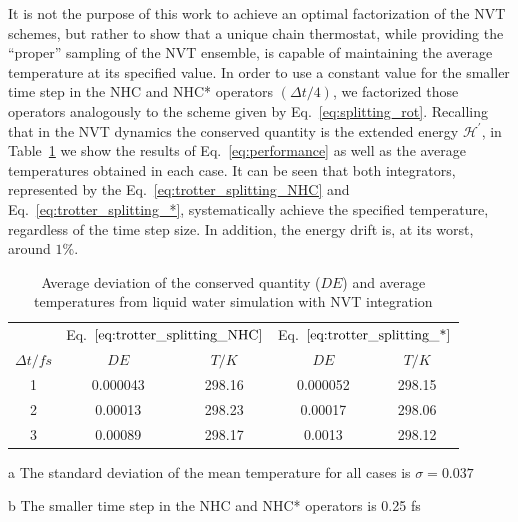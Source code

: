 \documentclass[aip,jcp,reprint,amsmath,amssymb]{revtex4-1}
\begin{document}
It is not the purpose of this work to achieve an optimal factorization of the NVT schemes, but rather to show that a unique chain thermostat, while providing the ``proper'' sampling of the NVT ensemble, is capable of maintaining the average temperature at its specified value. In order to use a constant value for the smaller time step in the NHC and NHC* operators $(\Delta t/4)$, we factorized those operators analogously to the scheme given by Eq.~\ref{eq:splitting_rot}. Recalling that in the NVT dynamics the conserved quantity is the extended energy $\mathcal{H}^\prime$, in Table~\ref{table:denvt} we show the results of Eq.~\ref{eq:performance} as well as the average temperatures obtained in each case. It can be seen that both integrators, represented by the Eq.~\ref{eq:trotter_splitting_NHC} and Eq.~\ref{eq:trotter_splitting_*}, systematically achieve the specified temperature, regardless of the time step size. In addition, the energy drift is, at its worst, around $1 \%$.


\begin{table}[h]
\setlength{\tabcolsep}{7pt}
\begin{threeparttable}
\caption{Average deviation of the conserved quantity ($DE$) and average temperatures from liquid water simulation with NVT integration } 
\label{table:denvt}

\centering %
\begin{tabular}{|c c c c c |}  
\hline
& \multicolumn{2}{c}{Eq.~$\ref{eq:trotter_splitting_NHC}$} &\multicolumn{2}{c|}{Eq.~$\ref{eq:trotter_splitting_*}$} \\
\cline{2-5}
$\Delta t/fs$ &$D E$ &$T/K$ &$D E$ &$T/K$\\
\hline %
 1  & 0.000043 & 298.16  & 0.000052  & 298.15 \\

 2  & 0.00013 & 298.23  & 0.00017 & 298.06  \\

 3  & 0.00089 & 298.17  & 0.0013 & 298.12  \\

 \hline
\end{tabular}
\begin{tablenotes}
\item[a] The standard deviation of the mean temperature for all cases is $\sigma = 0.037$
\item[b] The smaller time step in the NHC and NHC* operators is 0.25 fs 
\end{tablenotes}
\end{threeparttable}
\end{table}
\end{document}
